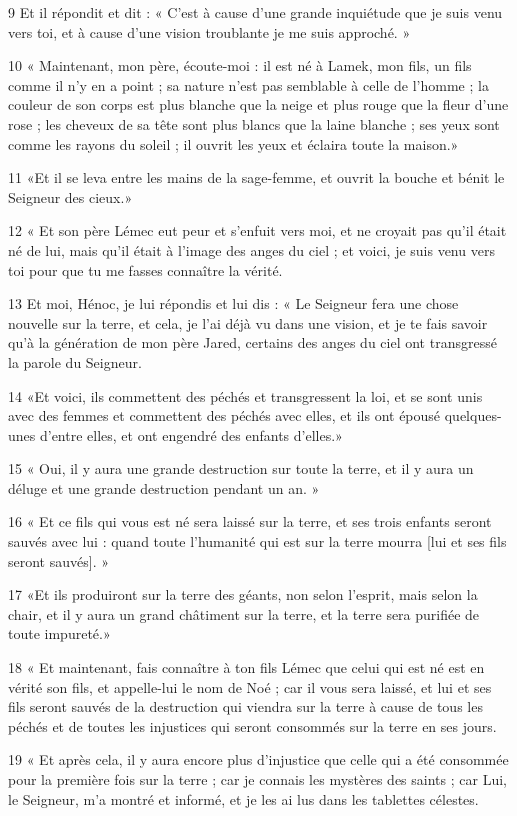 \par 9 Et il répondit et dit : « C'est à cause d'une grande inquiétude que je suis venu vers toi, et à cause d'une vision troublante je me suis approché. »
\par 10 « Maintenant, mon père, écoute-moi : il est né à Lamek, mon fils, un fils comme il n'y en a point ; sa nature n'est pas semblable à celle de l'homme ; la couleur de son corps est plus blanche que la neige et plus rouge que la fleur d'une rose ; les cheveux de sa tête sont plus blancs que la laine blanche ; ses yeux sont comme les rayons du soleil ; il ouvrit les yeux et éclaira toute la maison.»
\par 11 «Et il se leva entre les mains de la sage-femme, et ouvrit la bouche et bénit le Seigneur des cieux.»
\par 12 « Et son père Lémec eut peur et s'enfuit vers moi, et ne croyait pas qu'il était né de lui, mais qu'il était à l'image des anges du ciel ; et voici, je suis venu vers toi pour que tu me fasses connaître la vérité.
\par 13 Et moi, Hénoc, je lui répondis et lui dis : « Le Seigneur fera une chose nouvelle sur la terre, et cela, je l'ai déjà vu dans une vision, et je te fais savoir qu'à la génération de mon père Jared, certains des anges du ciel ont transgressé la parole du Seigneur.
\par 14 «Et voici, ils commettent des péchés et transgressent la loi, et se sont unis avec des femmes et commettent des péchés avec elles, et ils ont épousé quelques-unes d'entre elles, et ont engendré des enfants d'elles.»
\par 15 « Oui, il y aura une grande destruction sur toute la terre, et il y aura un déluge et une grande destruction pendant un an. »
\par 16 « Et ce fils qui vous est né sera laissé sur la terre, et ses trois enfants seront sauvés avec lui : quand toute l'humanité qui est sur la terre mourra [lui et ses fils seront sauvés]. »
\par 17 «Et ils produiront sur la terre des géants, non selon l'esprit, mais selon la chair, et il y aura un grand châtiment sur la terre, et la terre sera purifiée de toute impureté.»
\par 18 « Et maintenant, fais connaître à ton fils Lémec que celui qui est né est en vérité son fils, et appelle-lui le nom de Noé ; car il vous sera laissé, et lui et ses fils seront sauvés de la destruction qui viendra sur la terre à cause de tous les péchés et de toutes les injustices qui seront consommés sur la terre en ses jours.
\par 19 « Et après cela, il y aura encore plus d'injustice que celle qui a été consommée pour la première fois sur la terre ; car je connais les mystères des saints ; car Lui, le Seigneur, m'a montré et informé, et je les ai lus dans les tablettes célestes.

